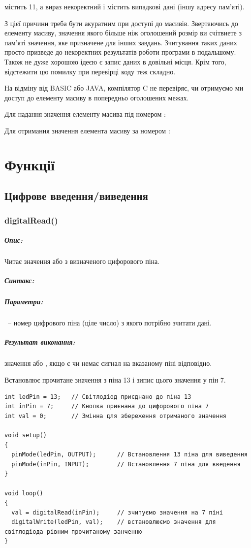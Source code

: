\documentclass[12pt,a4paper]{report}  %
\begin{document}
 містить 11, а вираз  некоректний і містить випадкові дані (іншу адресу пам'яті).

З цієї причини треба бути акуратним при доступі до масивів. Звертаючись до елементу масиву, значення якого більше ніж оголошений розмір ви счітвиете з пам'яті значення, яке призначене для інших завдань. Зчитування таких даних просто призведе до некоректних результатів роботи програми в подальшому. Також не дуже хорошою ідеєю є запис даних в довільні місця. Крім того, відстежити цю помилку при перевірці коду теж складно.

На відміну від BASIC або JAVA, компілятор C не перевіряє, чи отримуємо ми доступ до елементу масиву в попередньо оголошених межах.

Для надання значення елементу масива під номером :


Для отримання значення елемента масиву за номером :


\section{Функції}

\subsection{Цифрове введення/виведення}

\subsubsection{digitalRead()}

\subparagraph{Опис:}

Читає значення  або  з визначеного цифорового піна.
\subparagraph{Синтакс:}
\subparagraph{Параметри:}
~-- номер цифрового піна (ціле число) з якого потрібно зчитати дані.
\subparagraph{Результат виконання:}
значення  або , якщо є чи немає сигнал на вказаному піні відповідно.

Встановлює прочитане значення з піна 13 і зипис цього значення у пін 7.
\begin{lstlisting}[label=digitalreadwrite,caption=Використання функції digitalRead()]
int ledPin = 13;   // Світлодіод приєднано до піна 13
int inPin = 7;     // Кнопка приєнана до цифорового піна 7
int val = 0;       // Змінна для збереження отриманого значення

void setup()
{
  pinMode(ledPin, OUTPUT);      // Встановлення 13 піна для виведення
  pinMode(inPin, INPUT);        // Встановлення 7 піна для введення
}

void loop()
{
  val = digitalRead(inPin);     // зчитуємо значення на 7 піні
  digitalWrite(ledPin, val);    // встановлюємо значення для світлодіода рівним прочитаному занченню
}
\end{lstlisting}
\end{document}
